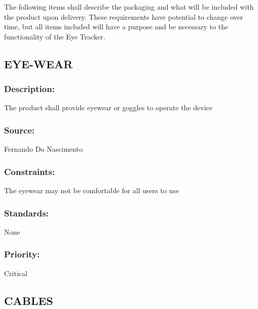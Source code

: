 The following items shall describe the packaging and what will be included with the product upon delivery. These requirements have potential to change over time, but all items included will have a purpose and be necessary to the functionality of the Eye Tracker.

\subsection{\text EYE-WEAR}
\subsubsection{Description:} 
	{The product shall provide eyewear or goggles to operate the device}
\subsubsection{Source:} 
	{Fernando Do Nascimento}
\subsubsection{Constraints:} 
	{The eyewear may not be comfortable for all users to use}
\subsubsection{Standards: }
	{None}
\subsubsection{Priority:} {Critical}
\newline
\newline

\subsection{\text CABLES}
